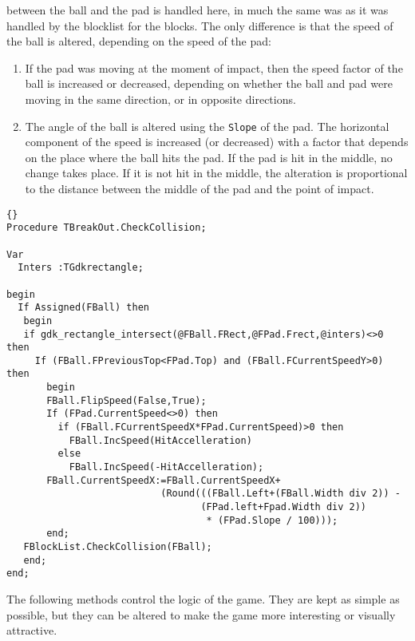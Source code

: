 \documentclass[10pt]{article}
\newcommand{\var}[1]{\texttt{#1}}
\begin{document}
between the ball and the pad is handled here, in much the same was as it was handled
by the blocklist for the blocks. The only difference is that the speed of the ball 
is altered, depending on the speed of the pad:
\begin{enumerate}
\item If the pad was moving at the moment of impact, then the speed factor of
the ball is increased or decreased, depending on whether the ball and pad
 were moving in the same direction, or in opposite directions.
\item The angle of the ball is altered using the \var{Slope} of the pad. The horizontal
component of the speed is increased (or decreased) with a factor that depends on
the place where the ball hits the pad. If the pad is hit in the middle, no change takes
place. If it is not hit in the middle, the alteration is proportional to the distance
between the middle of the pad and the point of impact.
\end{enumerate}
\begin{lstlisting}{}
Procedure TBreakOut.CheckCollision;

Var
  Inters :TGdkrectangle;

begin
  If Assigned(FBall) then
   begin
   if gdk_rectangle_intersect(@FBall.FRect,@FPad.Frect,@inters)<>0 then
     If (FBall.FPreviousTop<FPad.Top) and (FBall.FCurrentSpeedY>0) then
       begin
       FBall.FlipSpeed(False,True);
       If (FPad.CurrentSpeed<>0) then
         if (FBall.FCurrentSpeedX*FPad.CurrentSpeed)>0 then
           FBall.IncSpeed(HitAccelleration)
         else
           FBall.IncSpeed(-HitAccelleration);
       FBall.CurrentSpeedX:=FBall.CurrentSpeedX+
                           (Round(((FBall.Left+(FBall.Width div 2)) - 
                                  (FPad.left+Fpad.Width div 2)) 
                                   * (FPad.Slope / 100)));
       end; 
   FBlockList.CheckCollision(FBall);  
   end;
end;
\end{lstlisting}
The following methods control the logic of the game. They are kept as simple
as possible, but they can be altered to make the game more interesting or 
visually attractive.
\end{document}
